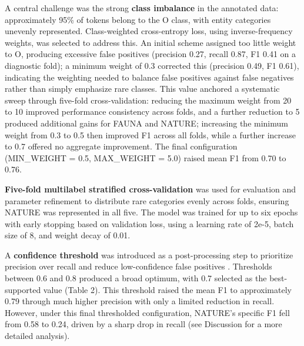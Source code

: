 \documentclass[11pt]{article}
\begin{document}
A central challenge was the strong \textbf{class imbalance} in the annotated data: approximately 95\% of tokens belong to the O class, with entity categories unevenly represented. Class-weighted cross-entropy loss, using inverse-frequency weights, was selected to address this. An initial scheme assigned too little weight to O, producing excessive false positives (precision 0.27, recall 0.87, F1 0.41 on a diagnostic fold); a minimum weight of 0.3 corrected this (precision 0.49, F1 0.61), indicating the weighting needed to balance false positives against false negatives rather than simply emphasize rare classes. This value anchored a systematic sweep through five-fold cross-validation: reducing the maximum weight from 20 to 10 improved performance consistency across folds, and a further reduction to 5 produced additional gains for FAUNA and NATURE; increasing the minimum weight from 0.3 to 0.5 then improved F1 across all folds, while a further increase to 0.7 offered no aggregate improvement. The final configuration (MIN\_WEIGHT = 0.5, MAX\_WEIGHT = 5.0) raised mean F1 from 0.70 to 0.76.

\textbf{Five-fold multilabel stratified cross-validation} was used for evaluation and parameter refinement to distribute rare categories evenly across folds, ensuring NATURE was represented in all five. The model was trained for up to six epochs with early stopping based on validation loss, using a learning rate of 2e-5, batch size of 8, and weight decay of 0.01.

A \textbf{confidence threshold} was introduced as a post-processing step to prioritize precision over recall and reduce low-confidence false positives \cite{zhu:22}. Thresholds between 0.6 and 0.8 produced a broad optimum, with 0.7 selected as the best-supported value (Table 2). This threshold raised the mean F1 to approximately 0.79 through much higher precision with only a limited reduction in recall. However, under this final thresholded configuration, NATURE’s specific F1 fell from 0.58 to 0.24, driven by a sharp drop in recall (see Discussion for a more detailed analysis).
\end{document}
